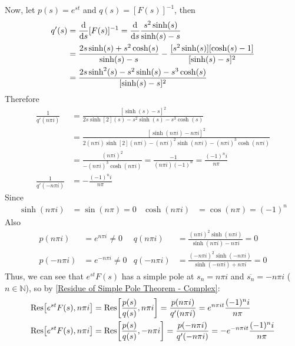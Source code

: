\documentclass[12pt, english]{book}
\makeatletter
\renewenvironment{proof}[1][\proofname]{\par
	\pushQED{\qed}%
	\normalfont \topsep6\p@\@plus6\p@\relax
	\list{}{%
		\settowidth{\leftmargin}{\itshape\proofname:\hskip\labelsep}%
		\setlength{\labelwidth}{0pt}%
		\setlength{\itemindent}{-\leftmargin}%
		}%
	\item[\hskip\labelsep\itshape#1\@addpunct{:}]\ignorespaces
	}{\popQED\endlist\@endpefalse}
\makeatother
\begin{document}
\begin{example}
\begin{proof}
{			Now, let \(p(s) = e^{st}\) and \(q(s) = [F(s)]^{-1}\), then
			\begin{align*}
				q'(s) 
				&= \dv{s} [F(s)]^{-1} = \dv{s} \frac{s^2 \sinh(s)}{\sinh(s) - s} \\
				&= \frac{2s\sinh(s) + s^2 \cosh(s)}{\sinh(s) - s}
					- \frac{[s^2 \sinh(s)][\cosh(s) - 1]}{[\sinh(s) - s]^{2}} \\
				&= \frac{2s\sinh[2](s) - s^2 \sinh(s) - s^3 \cosh(s)}{[\sinh(s) - s]^{2}}
			\end{align*}
			Therefore
			\begin{align*}
				\frac{1}{q'(n\pi i)}
				&= \frac{[\sinh(s) - s]^{2}}{2s\sinh[2](s) - s^2 \sinh(s) - s^3 \cosh(s)} \\
				&= \frac{[\sinh(n\pi i) - n\pi i]^{2}}{2(n\pi i)\sinh[2](n\pi i) - (n\pi i)^2 \sinh(n\pi i) - (n\pi i)^3 \cosh(n\pi i)} \\
				&= \frac{(n\pi i)^2}{-(n\pi i)^3 \cosh(n\pi i)} 
				 = \frac{-1}{(n\pi i)(-1)^n} = \frac{(-1)^{n} i}{n\pi} \\
				\frac{1}{q'(- n\pi i)} 
				&= - \frac{(-1)^{n} i}{n\pi}
			\end{align*}
			Since
			\begin{align*}
				\sinh(n\pi i) &= \sin(n\pi) = 0 	&
				\cosh(n\pi i) &= \cos(n\pi) = (-1)^n
			\end{align*}
			Also
			\begin{align*}
				p(n\pi i)  &= e^{n\pi i} \neq 0 &
				q(n\pi i) 
				&= \frac{(n\pi i)^2 \sinh(n\pi i)}{\sinh(n\pi i) - n\pi i} = 0 \\
				p(-n\pi i) &= e^{-n\pi i} \neq 0 &
				q(-n\pi i) 
				&= \frac{(-n\pi i)^2 \sinh(-n\pi i)}{\sinh(-n\pi i) + n\pi i} = 0 
			\end{align*}
			Thus, we can see that \(e^{st} F(s)\) has a simple pole at \(s_n = n\pi i\) and \(\overline{s_n} = -n\pi i\) (\(n\in \mathbb{N}\)), so by \cref{Residue of Simple Pole Theorem - Complex}: 
			\begin{align*}
				\Res[e^{st}F(s), n\pi i] 
				&= \Res[\frac{p(s)}{q(s)}, n\pi i] 
				 = \frac{p(n\pi i)}{q'(n\pi i)} 
				 = e^{n\pi i t} \frac{(-1)^{n} i}{n\pi}  \\
				\Res[e^{st}F(s), n\pi i] 
				&= \Res[\frac{p(s)}{q(s)}, -n\pi i] 
				 = \frac{p(-n\pi i)}{q'(-n\pi i)} 
				 = - e^{-n\pi i t} \frac{(-1)^{n} i}{n\pi}

\end{align*}}
\end{proof}
\end{example}
\end{document}

